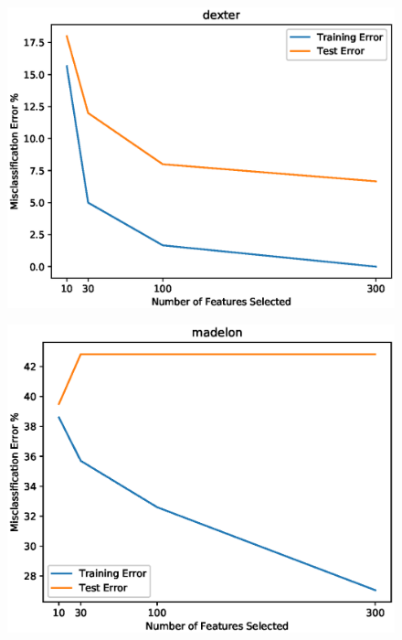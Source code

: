 \documentclass[UTF8]{article}
\begin{document}
\begin{figure}[H]
    \centering
    \includegraphics[scale=0.95]{./figures/dexter.eps}
\end{figure}

\begin{figure}[H]
    \centering
    \includegraphics[scale=0.95]{./figures/madelon.eps}
\end{figure}

\newpage
\end{document}
